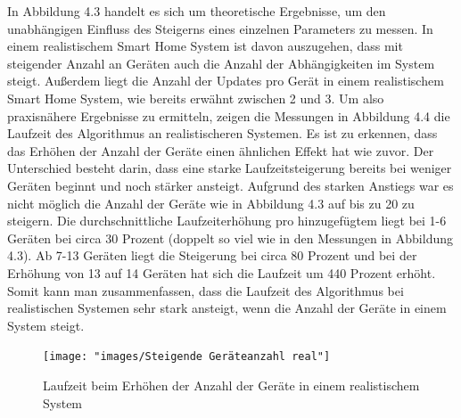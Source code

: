 \FloatBarrier
In Abbildung 4.3 handelt es sich um theoretische Ergebnisse, um den unabhängigen Einfluss des Steigerns eines einzelnen Parameters zu messen. In einem realistischem Smart Home System
ist davon auszugehen, dass mit steigender Anzahl an Geräten auch die Anzahl
der Abhängigkeiten im System steigt. Außerdem liegt die Anzahl der Updates pro Gerät in einem realistischem Smart Home System, wie bereits erwähnt zwischen 2 und 3. Um also
praxisnähere Ergebnisse zu ermitteln, zeigen die Messungen in Abbildung 4.4 die Laufzeit des Algorithmus an realistischeren Systemen.
Es ist zu erkennen, dass das Erhöhen der Anzahl der Geräte einen ähnlichen Effekt hat wie zuvor. Der Unterschied besteht darin, dass
eine starke Laufzeitsteigerung bereits bei weniger Geräten beginnt und noch stärker ansteigt. Aufgrund des starken Anstiegs war es nicht möglich die Anzahl der Geräte wie in Abbildung
4.3 auf bis zu 20 zu steigern. 
Die durchschnittliche Laufzeiterhöhung pro hinzugefügtem liegt bei 1-6 Geräten bei circa 30 Prozent (doppelt so viel wie in den Messungen in Abbildung 4.3).
Ab 7-13 Geräten liegt die Steigerung bei circa 80 Prozent und bei der Erhöhung von 13 auf 14
Geräten hat sich die Laufzeit um 440 Prozent erhöht. Somit kann man zusammenfassen, dass die Laufzeit des Algorithmus bei realistischen Systemen sehr stark ansteigt, wenn
die Anzahl der Geräte in einem System steigt.   
\begin{figure}[h]
\begin{center}
\texttt{[image: "images/Steigende Geräteanzahl real"]}
\caption{Laufzeit beim Erhöhen der Anzahl der Geräte in einem realistischem System}
\label{fig:Prob1:MEA}
\end{center}
\end{figure}

